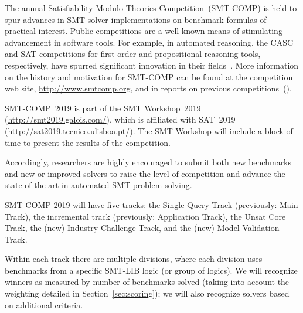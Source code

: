 \documentclass[12pt]{article}
\newcommand{\main}{Single Query\xspace}
\newcommand{\ucore}{Unsat Core\xspace}
\newcommand{\mval}{Model Validation\xspace}
\newcommand{\challenge}{Industry Challenge\xspace}
\begin{document}
The annual Satisfiability Modulo Theories Competition~(SMT-COMP) is
held to spur advances in SMT solver implementations on benchmark
formulas of practical interest.  Public competitions are a well-known
means of stimulating advancement in software tools.  For example, in
automated reasoning, the CASC and SAT competitions for first-order and
propositional reasoning tools, respectively, have spurred significant
innovation in their fields~\cite{leberre+03,PSS02}.  More information
on the history and motivation for SMT-COMP can be found at the
competition web site, \url{http://www.smtcomp.org}, and in reports on
previous
competitions~(\cite{SMTCOMP-JAR,SMTCOMP-FMSD,BDOS08,SMTCOMP-2008,CDW14,SMTCOMP-2012,CSW15}).

SMT-COMP~2019 is part of the SMT Workshop~2019
(\url{http://smt2019.galois.com/}),
which is affiliated with SAT~2019 (\url{http://sat2019.tecnico.ulisboa.pt/}).
The SMT Workshop will include a block of time to present the results of the
competition.

Accordingly, researchers are highly encouraged to submit both new
benchmarks and new or improved solvers to raise the level of
competition and advance the state-of-the-art in automated SMT problem
solving.

SMT-COMP 2019 will have five tracks: the \main Track (previously: Main Track),
the incremental track (previously: Application Track), the \ucore Track,
the (new) \challenge Track, and the (new)
\mval Track.

Within each track there are multiple divisions, where each division
uses benchmarks from a specific SMT-LIB logic (or group of logics).
We will recognize winners as measured by number of benchmarks solved
(taking into account the weighting detailed in
Section~\ref{sec:scoring}); we will also recognize solvers based on
additional criteria.
\end{document}

